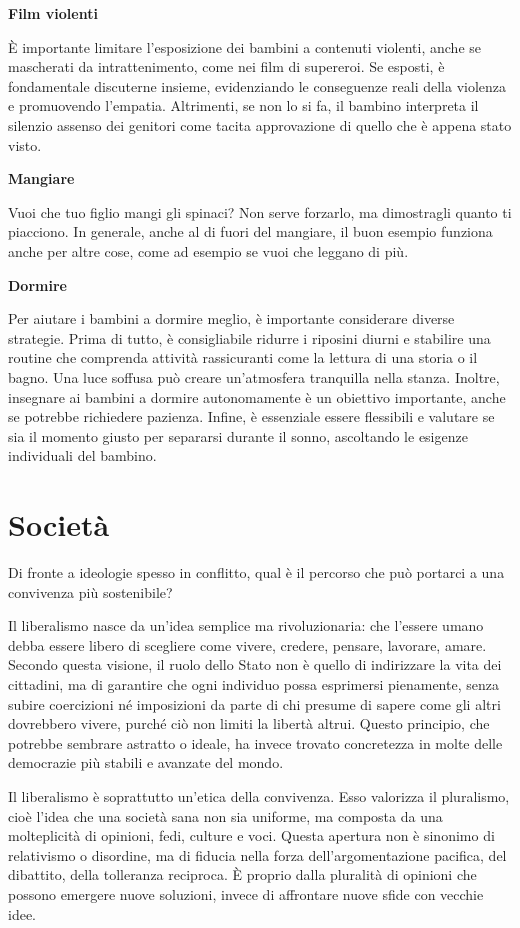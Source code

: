 \documentclass[12pt]{book} %
\begin{document}
\textbf{Film violenti}

È importante limitare l’esposizione dei bambini a contenuti violenti, anche se mascherati da intrattenimento, come nei film di supereroi. Se esposti, è fondamentale discuterne insieme, evidenziando le conseguenze reali della violenza e promuovendo l’empatia. Altrimenti, se non lo si fa, il bambino interpreta il silenzio assenso dei
genitori come tacita approvazione di quello che è appena stato visto.

\textbf{Mangiare}

Vuoi che tuo figlio mangi gli spinaci? Non serve forzarlo, ma dimostragli quanto ti piacciono. In generale, anche al di
fuori del mangiare, il buon esempio funziona anche per altre cose, come ad esempio se vuoi che leggano di più.

\textbf{Dormire}

Per aiutare i bambini a dormire meglio, è importante considerare diverse strategie. Prima di tutto, è consigliabile
ridurre i riposini diurni e stabilire una routine che comprenda attività rassicuranti come la lettura di una storia o
il bagno. Una luce soffusa può creare un'atmosfera tranquilla nella stanza. Inoltre, insegnare ai bambini a dormire
autonomamente è un obiettivo importante, anche se potrebbe richiedere pazienza. Infine, è essenziale essere flessibili
e valutare se sia il momento giusto per separarsi durante il sonno, ascoltando le esigenze individuali del bambino.

\clearpage\section{Società}
Di fronte a ideologie spesso in conflitto, qual è il percorso che può portarci a una convivenza più sostenibile?

Il liberalismo nasce da un’idea semplice ma rivoluzionaria: che l’essere umano debba essere libero di scegliere come vivere, credere, pensare, lavorare, amare. Secondo questa visione, il ruolo dello Stato non è quello di indirizzare la vita dei cittadini, ma di garantire che ogni individuo possa esprimersi pienamente, senza subire coercizioni né imposizioni da parte di chi presume di sapere come gli altri dovrebbero vivere, purché ciò non limiti la libertà altrui. Questo principio, che potrebbe sembrare astratto o ideale, ha invece trovato concretezza in molte delle democrazie più stabili e avanzate del mondo.

Il liberalismo è soprattutto un’etica della convivenza. Esso valorizza il pluralismo, cioè l’idea che una società sana non sia uniforme, ma composta da una molteplicità di opinioni, fedi, culture e voci. Questa apertura non è sinonimo di relativismo o disordine, ma di fiducia nella forza dell’argomentazione pacifica, del dibattito, della tolleranza reciproca. È proprio dalla pluralità di opinioni che possono emergere nuove soluzioni, invece di affrontare nuove sfide con vecchie idee.
\end{document}

